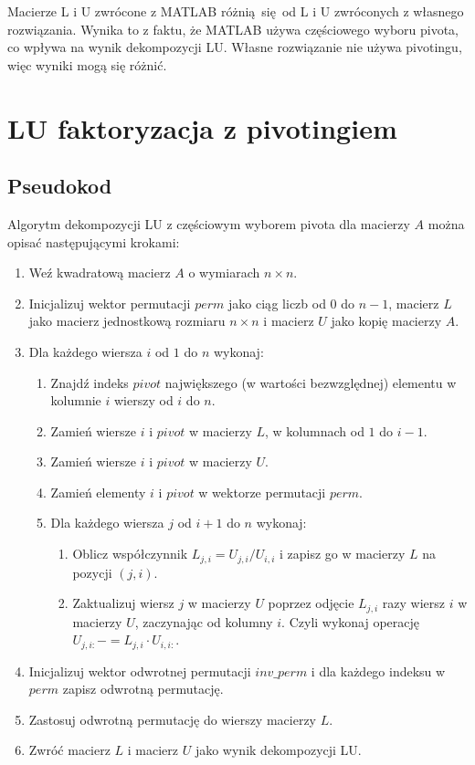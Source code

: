 \documentclass{article}
\begin{document}
Macierze L i U zwrócone z MATLAB różnią się od L i U zwróconych z własnego rozwiązania. Wynika to z faktu, że MATLAB używa częściowego wyboru pivota, co wpływa na wynik dekompozycji LU. Własne rozwiązanie nie używa pivotingu, więc wyniki mogą się różnić.

\section{LU faktoryzacja z pivotingiem}

\subsection{Pseudokod}

Algorytm dekompozycji LU z częściowym wyborem pivota dla macierzy $A$ można opisać następującymi krokami:

\begin{enumerate}
    \item Weź kwadratową macierz $A$ o wymiarach $n \times n$.
    \item Inicjalizuj wektor permutacji $perm$ jako ciąg liczb od $0$ do $n-1$, macierz $L$ jako macierz jednostkową rozmiaru $n \times n$ i macierz $U$ jako kopię macierzy $A$.
    \item Dla każdego wiersza $i$ od $1$ do $n$ wykonaj:
    \begin{enumerate}
        \item Znajdź indeks $pivot$ największego (w wartości bezwzględnej) elementu w kolumnie $i$ wierszy od $i$ do $n$.
        \item Zamień wiersze $i$ i $pivot$ w macierzy $L$, w kolumnach od $1$ do $i-1$.
        \item Zamień wiersze $i$ i $pivot$ w macierzy $U$.
        \item Zamień elementy $i$ i $pivot$ w wektorze permutacji $perm$.
        \item Dla każdego wiersza $j$ od $i+1$ do $n$ wykonaj:
        \begin{enumerate}
            \item Oblicz współczynnik $L_{j,i} = U_{j,i} / U_{i,i}$ i zapisz go w macierzy $L$ na pozycji $(j,i)$.
            \item Zaktualizuj wiersz $j$ w macierzy $U$ poprzez odjęcie $L_{j,i}$ razy wiersz $i$ w macierzy $U$, zaczynając od kolumny $i$. Czyli wykonaj operację $U_{j,i:} -= L_{j,i} \cdot U_{i,i:}$.
        \end{enumerate}
    \end{enumerate}
    \item Inicjalizuj wektor odwrotnej permutacji $inv\_perm$ i dla każdego indeksu w $perm$ zapisz odwrotną permutację.
    \item Zastosuj odwrotną permutację do wierszy macierzy $L$.
    \item Zwróć macierz $L$ i macierz $U$ jako wynik dekompozycji LU.
\end{enumerate}
\end{document}
